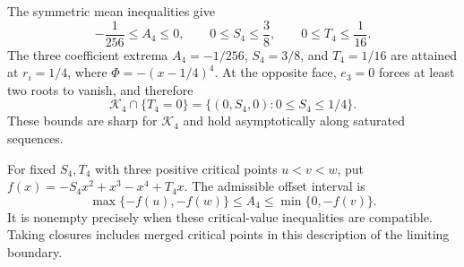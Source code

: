The symmetric mean inequalities give
\[
 -\frac1{256}\le A_4\le0,\qquad
 0\le S_4\le\frac38,\qquad 0\le T_4\le\frac1{16}.
\]
The three coefficient extrema $A_4=-1/256$, $S_4=3/8$,
and $T_4=1/16$ are attained at $r_i=1/4$, where
$\Phi=-(x-1/4)^4$. At the opposite face, $e_3=0$ forces at least two
roots to vanish, and therefore
\[
 \mathcal K_4\cap\{T_4=0\}
 =\{(0,S_4,0):0\le S_4\le1/4\}.
\]
These bounds are sharp for $\mathcal K_4$ and hold asymptotically along
saturated sequences.

For fixed $S_4,T_4$ with three positive critical points $u<v<w$, put
$f(x)=-S_4x^2+x^3-x^4+T_4x$. The admissible offset interval is
\[
 \max\{-f(u),-f(w)\}\le A_4\le\min\{0,-f(v)\}.
\]
It is nonempty precisely when these critical-value inequalities are
compatible. Taking closures includes merged critical points in this
description of the limiting boundary.
